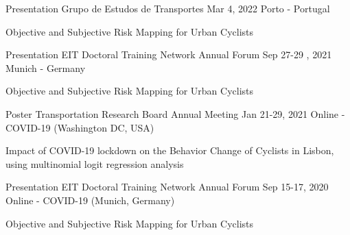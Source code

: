

\begin{cventries}

  \cventryshort
    {Presentation} %
    {Grupo de Estudos de Transportes} %
    {Mar 4, 2022} %
    {Porto - Portugal} %
    {
      \begin{cvitems} %
        \item {Objective and Subjective Risk Mapping for Urban Cyclists}
      \end{cvitems}
    }


  \cventryshort
    {Presentation} %
    {EIT Doctoral Training Network Annual Forum} %
    {Sep 27-29 , 2021} %
    {Munich - Germany} %
    {
      \begin{cvitems} %
        \item {Objective and Subjective Risk Mapping for Urban Cyclists}
      \end{cvitems}
    }


  \cventryshort
    {Poster} %
    {Transportation Research Board Annual Meeting} %
    {Jan 21-29, 2021} %
    {Online - COVID-19 (Washington DC, USA)} %
    {
      \begin{cvitems} %
        \item {Impact of COVID-19 lockdown on the Behavior Change of Cyclists in Lisbon, using multinomial logit regression analysis}
      \end{cvitems}
    }


  \cventryshort
    {Presentation} %
    {EIT Doctoral Training Network Annual Forum} %
    {Sep 15-17, 2020} %
    {Online - COVID-19 (Munich, Germany)} %
    {
      \begin{cvitems} %
        \item {Objective and Subjective Risk Mapping for Urban Cyclists}
      \end{cvitems}
    }


\end{cventries}
